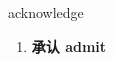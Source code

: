 
\begin{frame}
{\huge acknowledge}
\begin{center}
\begin{enumerate}\Large
  \item \textbf{承认 admit}
\end{enumerate}
\end{center}
\end{frame}
